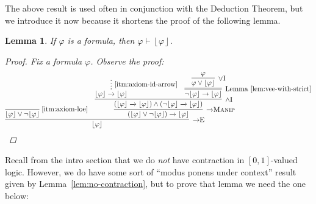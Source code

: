\documentclass{amsart}
\newtheorem{lemma}[theorem]{Lemma}
\theoremstyle{definition}
\numberwithin{equation}{theorem}
\renewcommand{\phi}{\varphi}
\newcommand{\unvee}{{\vee}}
\newcommand{\unwedge}{{\wedge}}
\newcommand{\proves}{\vdash}
\newcommand{\strict}[1]{{\left\lfloor#1\right\rfloor}}
\newcommand{\narrow}[1]{\xrightarrow{#1}}
\renewcommand{\to}{\narrow{}}
\newcommand{\arr}{{\to}}
\newcommand{\intro}{\!\operatorname{I}}
\newcommand{\elim}{\!\operatorname{E}}
\newcommand{\aref}[1]{\!\text{\ref{itm:axiom-#1}}}
\newcommand{\pushdown}{\arr\text{\sc{Manip}}}
\begin{document}
The above result is used often in conjunction with the Deduction Theorem, but we introduce it now because it shortens the proof of the following lemma.
\begin{lemma}\label{lem:proves-strict}
  If $\phi$ is a formula, then $\phi\proves\strict{\phi}$.
  \begin{proof} 
    Fix a formula $\phi$.
    Observe the proof:
    \[
      \infer[\arr\elim]{\strict\phi}{
        \infer[\aref{loe}]{\strict\phi\vee\neg\strict\phi}{} &
        \infer[\pushdown]{(\strict\phi\vee\neg\strict\phi)\to\strict\phi}{
          \infer[\unwedge\intro]{(\strict\phi\to\strict\phi)\wedge(\neg\strict\phi\to\strict\phi)}{
            \infer*[\aref{id-arrow}]{\strict\phi\to\strict\phi}{} &
            \infer=[\text{Lemma~\ref{lem:vee-with-strict}}]{\neg\strict\phi\to\strict\phi}{
              \infer[\unvee\intro]{\phi\vee\strict\phi}{\phi}
            }
          }
        }
      }\qedhere
    \]
  \end{proof}
\end{lemma}

Recall from the intro section that we do \emph{not} have contraction in $[0,1]$-valued logic.
However, we do have some sort of ``modus ponens under context'' result given by Lemma~\ref{lem:no-contraction}, but to prove that lemma we need the one below:
\end{document}
